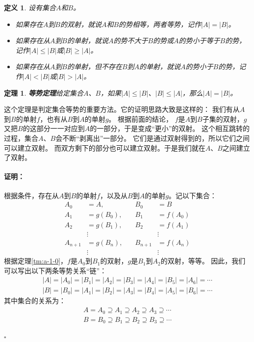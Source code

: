 \documentclass[12pt,UTF8]{ctexbook}
\renewenvironment{proof}{\paragraph{\textbf{证明：}}}{\hfill$\square$}
\newtheorem{df}{定义}[section]
\newtheorem{tm}{定理}[section]
\begin{document}
\begin{appendix}

\begin{df}\label{df:a-1-10}
    设有集合$A$和$B$。
    \begin{itemize}
        \item 如果存在$A$到$B$的双射，就说$A$和$B$的势相等，两者等势，记作$|A| = |B|$。
        \item 如果存在从$A$到$B$的单射，就说$A$的势不大于$B$的势或$A$的势小于等于$B$的势，记作$|A| \leqslant |B|$或$|B| \geqslant |A|$。
        \item 如果存在从$A$到$B$的单射，但不存在$B$到$A$的单射，就说$A$的势小于$B$的势，记作$|A| < |B|$或$|B| > |A|$。
    \end{itemize}
\end{df}

\begin{tm}{\textbf{等势定理}}\label{tm:a-1-10}
    给定集合$A$、$B$，如果$|A| \leqslant |B|$、$|B| \leqslant |A|$，那么$|A| = |B|$。
\end{tm}

这个定理是判定集合等势的重要方法。它的证明思路大致是这样的：
我们有从$A$到$B$的单射$f$，也有从$B$到$A$的单射$g$。
根据前面的结论，
$f$是$A$到$B$子集的双射，$g$又把$B$的这部分一一对应到$A$的一部分，于是变成“更小”的双射。
这个相互跳转的过程，集合$A$、$B$会不断“剥离出”一部分。
它们是通过双射得到的，所以它们之间可以建立双射。
而双方剩下的部分也可以建立双射。于是我们就在$A$、$B$之间建立了双射。

\begin{proof}
    根据条件，存在从$A$到$B$的单射$f$，以及从$B$到$A$的单射$g$。记以下集合：
    $$
    \begin{array}{rlrl}
        A_0&= A, \quad & B_0 &= B \\
        A_1&= g(B_0), \quad & B_1 &= f(A_0) \\
        A_2&= g(B_1), \quad & B_2 &= f(A_1) \\
        &\vdots & &\vdots \\
        A_{n+1}&= g(B_n), \quad & B_{n+1} &= f(A_n) \\
        &\vdots & &\vdots
    \end{array}
    $$
    根据定理\ref{tm:a-1-0}，$f$是$A_0$到$B_1$的双射，$g$是$B_1$到$A_2$的双射，等等。
    因此，我们可以写出以下两条等势关系“链”：
    \begin{align*}
        |A| = |A_0| = |B_1| = |A_2| = |B_3| = |A_4| = |B_5| = |A_6| = \cdots  \\
        |B| = |B_0| = |A_1| = |B_2| = |A_3| = |B_4| = |A_5| = |B_6| = \cdots   
    \end{align*}
    其中集合的关系为：
    \begin{align*}
        A = A_0 \supseteq A_1 \supseteq A_2 \supseteq A_3  \supseteq \cdots  \\
        B = B_0 \supseteq B_1 \supseteq B_2 \supseteq B_3  \supseteq \cdots   
    \end{align*}
    

\end{proof}
\end{appendix}
\end{document}
